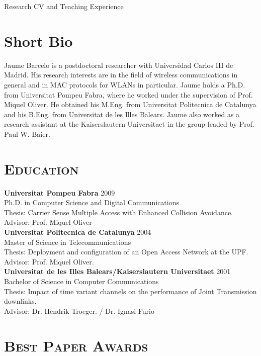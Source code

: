 \documentclass[line,margin]{res}
\begin{document}
%
% 
\begin{resume}
{\huge Research CV and Teaching Experience}

\section{Short Bio}
      Jaume Barcelo is a postdoctoral researcher with Universidad Carlos III de Madrid. His research interests are in the field of wireless communications in general and in MAC protocols for WLANs in particular. Jaume holds a Ph.D. from Universitat Pompeu Fabra, where he worked under the supervision of Prof. Miquel Oliver. He obtained his M.Eng. from Universitat Politecnica de Catalunya and his B.Eng. from Universitat de les Illes Balears. Jaume also worked as a research assistant at the Kaiserslautern Universitaet in the group leaded by Prof. Paul W. Baier.

\section{\textsc{Education}} 
\textbf{Universitat Pompeu Fabra} \hfill 2009 \\
Ph.D. in Computer Science and Digital Communications \\
 Thesis: Carrier Sense Multiple Access with Enhanced Collision Avoidance. \\
 Advisor: Prof. Miquel Oliver\\
\textbf{Universitat Politecnica de Catalunya} \hfill 2004 \\ 
Master of Science in Telecommunications \\
 Thesis: Deployment and configuration of an Open Access Network at the UPF. \\
 Advisor: Prof. Miquel Oliver.\\
\textbf{Universitat de les Illes Balears/Kaiserslautern Universitaet} \hfill 2001 \\ 
Bachelor of Science in Computer Communications \\
Thesis: Impact of time variant channels on the performance of Joint Transmission downlinks.\\
Advisor: Dr. Hendrik Troeger. / Dr. Ignasi Furio \\

\section{\textsc{Best Paper Awards}}


\end{resume}
\end{document}
